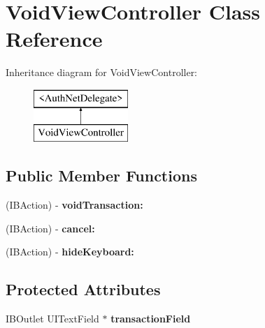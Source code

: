 \hypertarget{interface_void_view_controller}{
\section{VoidViewController Class Reference}
\label{interface_void_view_controller}
}
Inheritance diagram for VoidViewController:\begin{figure}[H]
\begin{center}
\leavevmode
\includegraphics[height=2.000000cm]{interface_void_view_controller}
\end{center}
\end{figure}
\subsection*{Public Member Functions}
\begin{DoxyCompactItemize}
\item 
\hypertarget{interface_void_view_controller_ab941cf110ae0df898583b349757bb839}{
(IBAction) -\/ {\bfseries voidTransaction:}}
\label{interface_void_view_controller_ab941cf110ae0df898583b349757bb839}

\item 
\hypertarget{interface_void_view_controller_a28040f0588bf8fe78b5fb5ff20b057a0}{
(IBAction) -\/ {\bfseries cancel:}}
\label{interface_void_view_controller_a28040f0588bf8fe78b5fb5ff20b057a0}

\item 
\hypertarget{interface_void_view_controller_a838023254c4a9f5f5c7cee19989c6710}{
(IBAction) -\/ {\bfseries hideKeyboard:}}
\label{interface_void_view_controller_a838023254c4a9f5f5c7cee19989c6710}

\end{DoxyCompactItemize}
\subsection*{Protected Attributes}
\begin{DoxyCompactItemize}
\item 
\hypertarget{interface_void_view_controller_af02f0253e62f3672927080f4d89c337f}{
IBOutlet UITextField $\ast$ {\bfseries transactionField}}
\label{interface_void_view_controller_af02f0253e62f3672927080f4d89c337f}

\end{DoxyCompactItemize}
